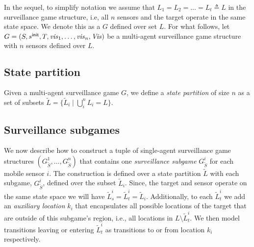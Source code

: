 In the sequel, to simplify notation we assume that $L_1 = L_2 = \dots = L_t \triangleq L$  in the surveillance game structure, i.e, all $n$ sensors and the target operate in the same state space. We denote this as a $G$ defined over set $L$. For what follows, let $G=(S,s^{\mathsf{init}},T,\mathit{vis}_1,\ldots,\mathit{vis}_n,\mathit{Vis})$ be a multi-agent surveillance game structure with $n$ sensors defined over $L$.

\subsection{State partition}
Given a multi-agent surveillance game $G$, we define a \emph{state partition} of size $n$ as a set of subsets $\widetilde{L} = \{\widetilde{L}_i \mid \bigcup_i^n L_i = L \}$. 


\subsection{Surveillance subgames}
We now describe how to construct a tuple of single-agent surveillance game structures $(G^{1}_{\tilde{S}},\ldots,G^{n}_{\tilde{S}})$ that contains one  \emph{surveillance subgame} $G^{i}_{\tilde{S}}$ for each mobile sensor  $i$. The construction is defined over a state partition $\widetilde{L}$ with each subgame, $G^{i}_{\tilde{S}}$, defined over the subset $\widetilde{L}_i$. Since, the target and sensor operate on the same state space we will have $\widetilde{L}^i_s = \widetilde{L}^i_t = \widetilde{L}_i$. Additionally, to each $\widetilde{L}^i_t$ we add an \emph{auxiliary location} $k_i$ that encapsulates all possible locations of the target that are outside of this subgame's region, i.e., all locations in $L \setminus \widetilde{L}^i_t$.  We then model transitions leaving or entering $\widetilde{L}^i_t$ as transitions to or from location $k_i$ respectively.




